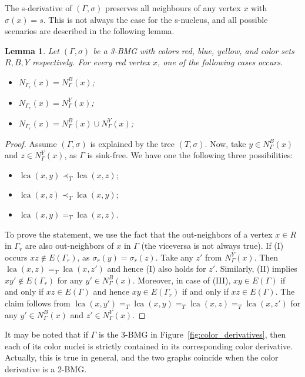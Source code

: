 \documentclass[final,3p,times]{elsarticle}
\newtheorem{lemma}[theorem]{Lemma}%
\DeclareMathOperator{\lca}{lca}
\begin{document}
The s-derivative of $(\Gamma,\sigma)$ preserves all neighbours of any vertex $x$ with $\sigma(x)=s$. This is not always the case for the s-nucleus, and all possible scenarios are described in the following lemma. 
\begin{lemma}
\label{lemma:neighbours_condition}
Let $(\Gamma,\sigma)$ be a 3-BMG with colors red, blue, yellow, and color sets $R,B,Y$ respectively. For every red vertex $x$, one of the following cases occurs.
\begin{itemize}
\item[(i)] $N_{\Gamma_r}(x)=N_{\Gamma}^{B}(x)$;
\item[(ii)] $N_{\Gamma_r}(x)=N_{\Gamma}^{Y}(x)$;
\item[(iii)] $N_{\Gamma_r}(x)=N_{\Gamma}^{B}(x)\cup N_{\Gamma}^{Y}(x)$;
\end{itemize}
\end{lemma}
\begin{proof} 
Assume $(\Gamma,\sigma)$ is explained by the tree $(T,\sigma)$. Now, take $y\in N_{\Gamma}^{B}(x)$ and $z\in N_{\Gamma}^{Y}(x)$, as $\Gamma$ is sink-free.  We have one the following three possibilities:
\begin{itemize}
\item[(I)] $\lca(x,y)\prec_T \lca(x,z)$;
\item[(II)] $\lca(x,z)\prec_T \lca(x,y)$;
\item[(III)] $\lca(x,y)=_T \lca(x,z)$.
\end{itemize}
To prove the statement, we use the fact that the out-neighbors of a vertex $x \in R$ in $\Gamma_r$ are also out-neighbors of $x$ in $\Gamma$ (the viceversa is not always true).
If (I) occurs $xz\not\in E(\Gamma_r)$, as $\sigma_r(y)=\sigma_r(z)$. Take any $z'$ from $N_{\Gamma}^{Y}(x)$. Then $\lca(x,z)=_T \lca(x,z')$ and hence (I) also holds for $z'$. Similarly, (II) implies $xy'\not\in E(\Gamma_r)$ for any $y'\in N_{\Gamma}^{B}(x)$. Moreover, in case of (III),  $xy\in E(\Gamma)$ if and only if $xz\in E(\Gamma)$ and hence $xy\in E(\Gamma_r)$ if and only if $xz\in E(\Gamma)$. The claim follows from  $\lca(x,y')=_T \lca(x,y)=_T\lca(x,z)=_T \lca(x,z')$ for any $y'\in N_{\Gamma}^{B}(x)$ and $z'\in N_{\Gamma}^{Y}(x)$.
\end{proof}

It may be noted that if $\Gamma$ is the 3-BMG in Figure~\ref{fig:color_derivatives}, then each of its color nuclei is strictly contained in its corresponding color derivative. Actually, this is true in general, and the two graphs coincide when the color derivative is a 2-BMG.
\end{document}
